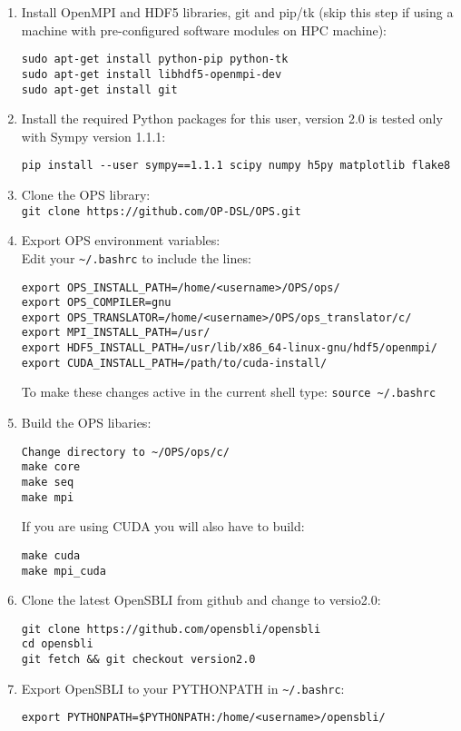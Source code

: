 \documentclass[11pt]{article}
\begin{document}
\begin{enumerate}
\item{Install OpenMPI and HDF5 libraries, git and pip/tk (skip this step if using a machine with pre-configured software modules on HPC machine):
\begin{verbatim}
sudo apt-get install python-pip python-tk
sudo apt-get install libhdf5-openmpi-dev
sudo apt-get install git
\end{verbatim}}
\item{Install the required Python packages for this user, version 2.0 is tested only with Sympy version 1.1.1:}
\begin{verbatim}
pip install --user sympy==1.1.1 scipy numpy h5py matplotlib flake8
\end{verbatim}
\item{Clone the OPS library:\\ \verb|git clone https://github.com/OP-DSL/OPS.git|}
\item{Export OPS environment variables:\\ Edit your \verb|~/.bashrc| to include the lines:}
\begin{verbatim}
export OPS_INSTALL_PATH=/home/<username>/OPS/ops/
export OPS_COMPILER=gnu
export OPS_TRANSLATOR=/home/<username>/OPS/ops_translator/c/
export MPI_INSTALL_PATH=/usr/
export HDF5_INSTALL_PATH=/usr/lib/x86_64-linux-gnu/hdf5/openmpi/
export CUDA_INSTALL_PATH=/path/to/cuda-install/
\end{verbatim}
To make these changes active in the current shell type: \verb|source ~/.bashrc|
\item{Build the OPS libaries:}
\begin{verbatim}
Change directory to ~/OPS/ops/c/
make core
make seq
make mpi
\end{verbatim}
If you are using CUDA you will also have to build:
\begin{verbatim}
make cuda
make mpi_cuda
\end{verbatim}

\item{Clone the latest OpenSBLI from github and change to versio2.0:}
\begin{verbatim}
git clone https://github.com/opensbli/opensbli
cd opensbli
git fetch && git checkout version2.0
\end{verbatim}

\item{Export OpenSBLI to your PYTHONPATH in \verb|~/.bashrc|:}
\begin{verbatim}
export PYTHONPATH=$PYTHONPATH:/home/<username>/opensbli/
\end{verbatim}


\end{enumerate}
\end{document}
